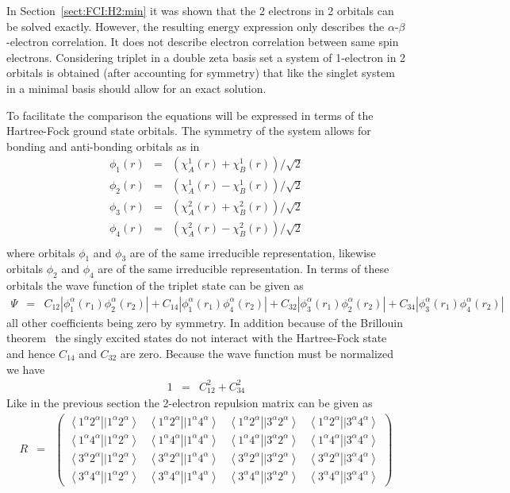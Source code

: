 \documentclass[pra,nofootinbib]{revtex4-1}
\newcommand{\erib}[4]{\left\langle #1^\alpha #2^\alpha \right.\left|| #3^\alpha #4^\alpha \right\rangle}
\begin{document}
In Section~\ref{sect:FCI:H2:min} it was shown that the 2 electrons in 2 orbitals can be solved exactly.
However, the resulting energy expression only describes the $\alpha$-$\beta$-electron correlation. It 
does not describe electron correlation between same spin electrons. Considering triplet  in 
a double zeta basis set a system of 1-electron in 2 orbitals is obtained (after accounting for symmetry)
that like the singlet system in a minimal basis should allow for an exact solution.

To facilitate the comparison the equations will be expressed in terms of the Hartree-Fock ground state
orbitals. The symmetry of the system allows for bonding and anti-bonding orbitals as in
\begin{eqnarray}
   \phi_1(r) &=& (\chi_A^1(r)+\chi_B^1(r))/\sqrt{2} \\
   \phi_2(r) &=& (\chi_A^1(r)-\chi_B^1(r))/\sqrt{2} \\
   \phi_3(r) &=& (\chi_A^2(r)+\chi_B^2(r))/\sqrt{2} \\
   \phi_4(r) &=& (\chi_A^2(r)-\chi_B^2(r))/\sqrt{2} \\
\end{eqnarray}
where orbitals $\phi_1$ and $\phi_3$ are of the same irreducible representation, likewise
orbitals $\phi_2$ and $\phi_4$ are of the same irreducible representation.
In terms of these orbitals the wave function of the triplet state can be given as
\begin{eqnarray}
  \Psi &=& C_{12}|\phi^\alpha_1(r_1)\phi^\alpha_2(r_2)|
        +  C_{14}|\phi^\alpha_1(r_1)\phi^\alpha_4(r_2)|
        +  C_{32}|\phi^\alpha_3(r_1)\phi^\alpha_2(r_2)|
        +  C_{34}|\phi^\alpha_3(r_1)\phi^\alpha_4(r_2)|
\end{eqnarray}
all other coefficients being zero by symmetry.
In addition because of the Brillouin theorem~\cite{Surj_n_1989} the singly excited states do not interact
with the Hartree-Fock state and hence $C_{14}$ and $C_{32}$ are zero.
Because the wave function must be normalized we have
\begin{eqnarray}
  1 &=& C_{12}^2 + C_{34}^2
\end{eqnarray}
Like in the previous section the 2-electron repulsion matrix can be given as
\begin{eqnarray}
  R &=& 
  \begin{pmatrix}
  \erib{1}{2}{1}{2} & \erib{1}{2}{1}{4} & \erib{1}{2}{3}{2} & \erib{1}{2}{3}{4} \\
  \erib{1}{4}{1}{2} & \erib{1}{4}{1}{4} & \erib{1}{4}{3}{2} & \erib{1}{4}{3}{4} \\
  \erib{3}{2}{1}{2} & \erib{3}{2}{1}{4} & \erib{3}{2}{3}{2} & \erib{3}{2}{3}{4} \\
  \erib{3}{4}{1}{2} & \erib{3}{4}{1}{4} & \erib{3}{4}{3}{2} & \erib{3}{4}{3}{4} 
  \end{pmatrix}
\end{eqnarray}
\end{document}
